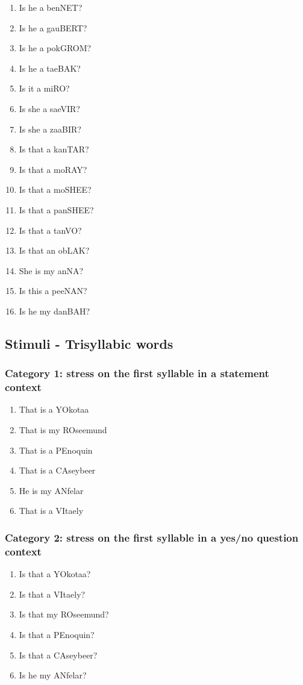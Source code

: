 \documentclass[a4paper]{article}
\begin{document}
\begin{enumerate}
\item Is he a benNET?
\item Is he a gauBERT?
\item Is he a pokGROM?
\item Is he a taeBAK?
\item Is it a miRO?
\item Is she a saeVIR?
\item Is she a zaaBIR?
\item Is that a kanTAR?
\item Is that a moRAY?
\item Is that a moSHEE?
\item Is that a panSHEE?
\item Is that a tanVO?
\item Is that an obLAK?
\item She is my anNA?
\item Is this a peeNAN?
\item Is he my danBAH?
\end{enumerate}

\subsection{Stimuli - Trisyllabic words}

\subsubsection{Category 1: stress on the first syllable in a statement context}

\begin{enumerate}
\item That is a YOkotaa
\item That is my ROseemund
\item That is a PEnoquin
\item That is a CAseybeer
\item He is my ANfelar
\item That is a VItaely
\end{enumerate}

\subsubsection{Category 2: stress on the first syllable in a yes/no question context}

\begin{enumerate}
\item Is that a YOkotaa?
\item Is that a VItaely?
\item Is that my ROseemund?
\item Is that a PEnoquin?
\item Is that a CAseybeer?
\item Is he my ANfelar?
\end{enumerate}
\end{document}

